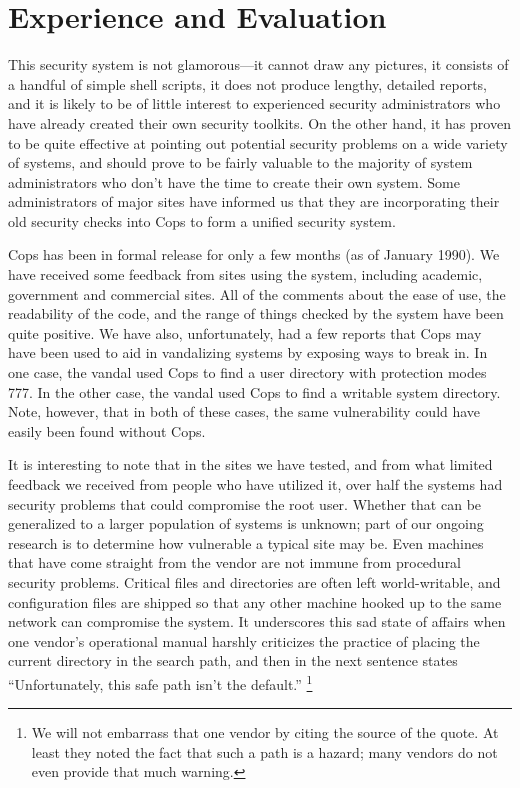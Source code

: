 \section{Experience and Evaluation}

This security system is not glamorous---it cannot draw any pictures,
it consists of a handful of simple shell scripts, it does not produce
lengthy, detailed reports, and it is likely to be of little interest to
experienced security administrators who have already created their own
security toolkits.  On the other hand, it has
proven to be quite effective at pointing out potential security problems
on a wide variety of systems, and should prove to be fairly valuable
to the majority of system administrators who don't have the time to create
their own system. Some administrators of major sites have informed
us that they are incorporating their old security checks into {\sc Cops} to
form a unified security system. 

{\sc Cops} has been in formal release for only a few months (as of
January 1990).  We have received
some feedback from sites using the system, including academic, government
and commercial sites.  All of the comments about
the ease of use,  the readability of the code, and the range of things
checked by the system have been quite positive.  We have also,
unfortunately, had a few reports that {\sc Cops} may have been used to aid in
vandalizing systems by exposing ways to break in.  In one case, the vandal
used {\sc Cops} to find a user directory with protection modes 777.  In the other
case, the vandal used {\sc Cops} to find a writable system directory.  Note,
however, that in both of these cases, the same vulnerability could have
easily been found without {\sc Cops}.

It is interesting to note that in the sites we have tested, and from what
limited feedback we received from people who have utilized it, over half the
systems had security problems that could compromise the root user.  Whether that can
be generalized to a larger population of  systems is unknown; part
of our ongoing research is to determine how vulnerable a typical site may
be.  Even machines that have come straight from the vendor are not immune
from procedural security problems.  Critical files and directories are often
left world-writable, and configuration files are shipped so that any other
machine hooked up to the same network can compromise the system.  It
underscores this sad state of affairs when one vendor's operational manual
harshly criticizes the practice of placing the current directory in the
search path, and then in the next sentence  states ``Unfortunately, this
safe path isn't the default.''
\footnote{
We will not embarrass that one vendor by citing the source of the
quote.  At least they noted the fact that such a path is a hazard;
many vendors do not even provide that much warning.
}


